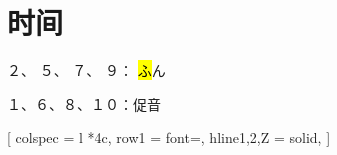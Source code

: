 \section{时间}

２、 ５、 ７、 ９： \hl{ふ}ん

１、６、８、１０：促音


[
  colspec = {l *{4}{c}},
  row{1} = {font=\bfseries},
  hline{1,2,Z} = {solid},
]
